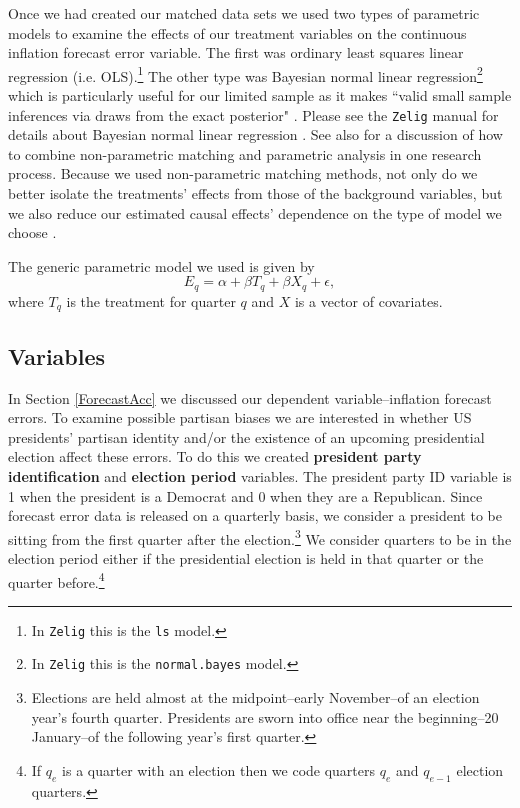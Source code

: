 \documentclass[a4paper]{article}\usepackage{graphicx, color}
\begin{document}
Once we had created our matched data sets we used two types of parametric models to examine the effects of our treatment variables on the continuous inflation forecast error variable. The first was ordinary least squares linear regression (i.e. OLS).\footnote{In {\tt{Zelig}} this is the {\tt{ls}} model.} The other type was Bayesian normal linear regression\footnote{In {\tt{Zelig}} this is the {\tt{normal.bayes}} model.} which is particularly useful for our limited sample as it makes ``valid small sample inferences via draws from the exact posterior" \citep[][38]{Zelig2012}. Please see the {\tt{Zelig}} manual for details about Bayesian normal linear regression \citep{Goodrich2007}.  See also \cite{Imai2008} for a discussion of how to combine non-parametric matching and parametric analysis in one research process. Because we used non-parametric matching methods, not only do we better isolate the treatments' effects from those of the background variables, but we also reduce our estimated causal effects' dependence on the type of model we choose \cite[200--201]{Ho2007}.

The generic parametric model we used is given by
%
\begin{equation}
    E_{q} = \alpha + \beta T_{q} + \beta X_{q} + \epsilon,
\end{equation}
%
where $T_{q}$ is the treatment for quarter $q$ and $X$ is a vector of covariates. 

\subsection{Variables}

In Section \ref{ForecastAcc} we discussed our dependent variable--inflation forecast errors. To examine possible partisan biases we are interested in whether US presidents' partisan identity and/or the existence of an upcoming presidential election affect these errors. To do this we created {\bf{president party identification}} and {\bf{election period}} variables. The president party ID variable is 1 when the president is a Democrat and 0 when they are a Republican. Since forecast error data is released on a quarterly basis, we consider a president to be sitting from the first quarter after the election.\footnote{Elections are held almost at the midpoint--early November--of an election year's fourth quarter. Presidents are sworn into office near the beginning--20 January--of the following year's first quarter.} We consider quarters to be in the election period either if the presidential election is held in that quarter or the quarter before.\footnote{If $q_{e}$ is a quarter with an election then we code quarters $q_{e}$ and $q_{e-1}$ election quarters.}
\end{document}
